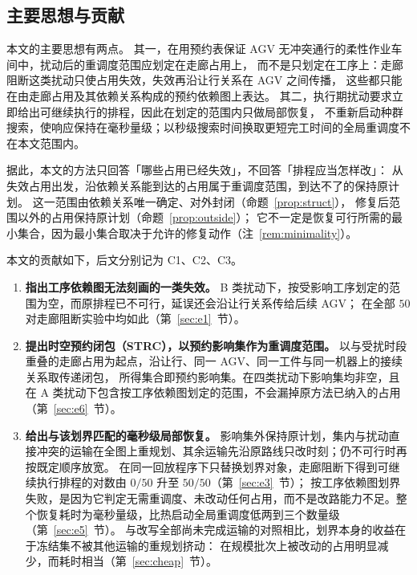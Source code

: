\documentclass[manuscript,screen,review]{acmart}
\providecommand{\STRC}{\textsc{STRC}}
\newcommand{\NPairs}{50}
\newcommand{\FeasRone}{0/\NPairs}            %
\newcommand{\FeasRtwo}{\NPairs/\NPairs}  %
\begin{document}
\subsection{主要思想与贡献}
\label{sec:contributions}

本文的主要思想有两点。
其一，在用预约表保证 AGV 无冲突通行的柔性作业车间中，扰动后的重调度范围应划定在走廊占用上，
而不是只划定在工序上：走廊阻断这类扰动只使占用失效，失效再沿让行关系在 AGV 之间传播，
这些都只能在由走廊占用及其依赖关系构成的预约依赖图上表达。
其二，执行期扰动要求立即给出可继续执行的排程，因此在划定的范围内只做局部恢复，
不重新启动种群搜索，使响应保持在毫秒量级；以秒级搜索时间换取更短完工时间的全局重调度不在本文范围内。

据此，本文的方法只回答「哪些占用已经失效」，不回答「排程应当怎样改」：
从失效占用出发，沿依赖关系能到达的占用属于重调度范围，到达不了的保持原计划。
这一范围由依赖关系唯一确定、对外封闭（命题~\ref{prop:struct}），
修复后范围以外的占用保持原计划（命题~\ref{prop:outside}）；
它不一定是恢复可行所需的最小集合，因为最小集合取决于允许的修复动作（注~\ref{rem:minimality}）。

本文的贡献如下，后文分别记为 C1、C2、C3。
\begin{enumerate}[label=\textbf{C\arabic*.},leftmargin=2.2em,itemsep=0.4em]
\item \textbf{指出工序依赖图无法刻画的一类失效。}
B 类扰动下，按受影响工序划定的范围为空，而原排程已不可行，延误还会沿让行关系传给后续 AGV；
在全部 \(\NPairs\) 对走廊阻断实验中均如此（第~\ref{sec:e1}~节）。

\item \textbf{提出时空预约闭包（\STRC），以预约影响集作为重调度范围。}
以与受扰时段重叠的走廊占用为起点，沿让行、同一 AGV、同一工件与同一机器上的接续关系取传递闭包，
所得集合即预约影响集。在四类扰动下影响集均非空，且在 A 类扰动下包含按工序依赖图划定的范围，不会漏掉原方法已纳入的占用（第~\ref{sec:e6}~节）。

\item \textbf{给出与该划界匹配的毫秒级局部恢复。}
影响集外保持原计划，集内与扰动直接冲突的运输在全图上重规划、其余运输先沿原路线只改时刻；仍不可行时再按既定顺序放宽。
在同一回放程序下只替换划界对象，走廊阻断下得到可继续执行排程的对数由 \(\FeasRone\) 升至 \(\FeasRtwo\)（第~\ref{sec:e3}~节）；
按工序依赖图划界失败，是因为它判定无需重调度、未改动任何占用，而不是改路能力不足。整个恢复耗时为毫秒量级，比热启动全局重调度低两到三个数量级（第~\ref{sec:e5}~节）。
与改写全部尚未完成运输的对照相比，划界本身的收益在于冻结集不被其他运输的重规划挤动：
在规模批次上被改动的占用明显减少，而耗时相当（第~\ref{sec:cheap}~节）。
\end{enumerate}
\end{document}
